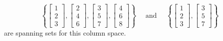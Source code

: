 \begin{equation*}
\left\{
\begin{bmatrix}
1 \\
2 \\
3 
\end{bmatrix}
,
\begin{bmatrix}
2 \\
4 \\
6
\end{bmatrix}
,
\begin{bmatrix}
3 \\
5 \\
7
\end{bmatrix}
,
\begin{bmatrix}
4 \\
6 \\
8
\end{bmatrix}
\right\}
\quad \text{ and } \quad 
\left\{
\begin{bmatrix}
1 \\
2 \\
3
\end{bmatrix}
,
\begin{bmatrix}
3 \\
5 \\
7
\end{bmatrix}
\right\} 
\end{equation*} are spanning sets for this column space.

\medskip


